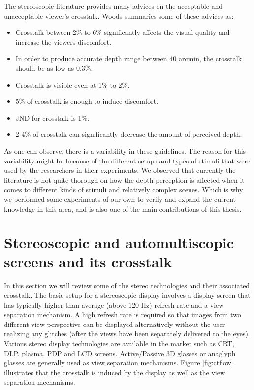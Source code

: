 The stereoscopic literature provides many advices on the acceptable and unacceptable viewer's crosstalk. Woods \cite{woods2012crosstalk} summaries some of these advices as:
\begin{itemize}
	\item Crosstalk between 2\% to 6\% significantly affects the visual quality and increase the viewers discomfort.
	\item In order to produce accurate depth range between 40 arcmin, the crosstalk should be as low as 0.3\%.
	\item Crosstalk is visible even at 1\% to 2\%.
	\item 5\% of crosstalk is enough to induce discomfort.
	\item JND for crosstalk is 1\%.
	\item 2-4\% of crosstalk can significantly decrease the amount of perceived depth.
\end{itemize}

As one can observe, there is a variability in these guidelines. The reason for this variability might be because of the different setups and types of stimuli that were used by the researchers in their experiments. We observed that currently the literature is not quite thorough on how the depth perception is affected when it comes to different kinds of stimuli and relatively complex scenes. Which is why we performed some experiments of our own to verify and expand the current knowledge in this area, and is also one of the main contributions of this thesis.

\section{Stereoscopic and automultiscopic screens and its crosstalk}

In this section we will review some of the stereo technologies and their associated crosstalk. The basic setup for a stereoscopic display involves a display screen that has typically higher than average (above 120 Hz) refresh rate and a view separation mechanism. A high refresh rate is required so that images from two different view perspective can be displayed alternatively without the user realizing any glitches (after the views have been separately delivered to the eyes). Various stereo display technologies are available in the market such as CRT, DLP, plasma, PDP and LCD screens. Active/Passive 3D glasses or anaglyph glasses are generally used as view separation mechanisms. Figure \ref{fig:ctflow} illustrates that the crosstalk is induced by the display as well as the view separation mechanisms.

